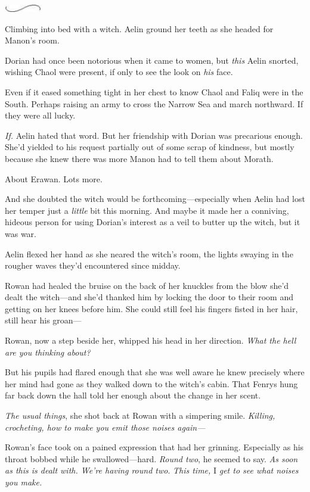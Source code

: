 \includegraphics[width=0.65in,height=0.13in]{images/seperator}

Climbing into bed with a witch. Aelin ground her teeth as she headed for Manon's room.

Dorian had once been notorious when it came to women, but \emph{this}
 Aelin snorted, wishing Chaol were present, if only to see the look on \emph{his} face.

Even if it eased something tight in her chest to know Chaol and Faliq were in the South. Perhaps raising an army to cross the Narrow Sea and march northward. If they were all lucky.

\emph{If.} Aelin hated that word. But  her friendship with Dorian was precarious enough. She'd yielded to his request partially out of some scrap of kindness, but mostly because she knew there was more Manon had to tell them about Morath.

About Erawan. Lots more.

And she doubted the witch would be forthcoming---especially when Aelin had lost her temper just a \emph{little} bit this morning. And maybe it made her a conniving, hideous person for using Dorian's interest as a veil to butter up the witch, but  it was war.

Aelin flexed her hand as she neared the witch's room, the lights swaying in the rougher waves they'd encountered since midday.

Rowan had healed the bruise on the back of her knuckles from the blow she'd dealt the witch---and she'd thanked him by locking the door to their room and getting on her knees before him. She could still feel his fingers fisted in her hair, still hear his groan---

Rowan, now a step beside her, whipped his head in her direction.
\emph{What the hell are you thinking about?}

But his pupils had flared enough that she was well aware he knew precisely where her mind had gone as they walked down to the witch's cabin. That Fenrys hung far back down the hall told her enough about the change in her scent.

\emph{The usual things}, she shot back at Rowan with a simpering smile.
\emph{Killing, crocheting, how to make you emit those noises again---}

Rowan's face took on a pained expression that had her grinning. Especially as his throat bobbed while he swallowed---hard. \emph{Round two}, he seemed to say. \emph{As soon as this is dealt with. We're having round two}. \emph{This time,} I \emph{get to see what noises you make.}

